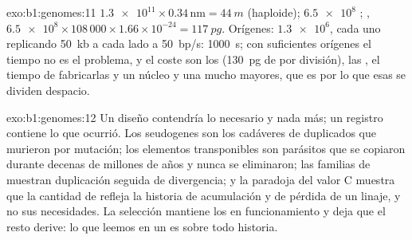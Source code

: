 \begin{solution}{exo:b1:genomes:11}
$\num{1.3e11}\times 0.34\,\mathrm{nm} = \qty{44}{m}$ (haploide);
$\num{6.5e8}$ ; , $\num{6.5e8}\times 108\,000\times
1.66\times 10^{-24} = \qty{117}{pg}$. Orígenes: $\num{1.3e6}$, cada uno
replicando \qty{50}{kb} a cada lado a \qty{50}{bp/s}: \qty{1000}{s}; con
suficientes orígenes el tiempo no es el problema, y el coste son los
 (\qty{130}{pg} de  por división), las , el tiempo de
fabricarlas y un núcleo y una  mucho mayores, que es por lo que esas
 se dividen despacio.
\end{solution}

\begin{solution}{exo:b1:genomes:12}
Un diseño contendría lo necesario y nada más; un registro contiene lo que
ocurrió. Los seudogenes son los cadáveres de  duplicados que murieron
por mutación; los elementos transponibles son parásitos que se copiaron
durante decenas de millones de años y nunca se eliminaron; las familias de
 muestran duplicación seguida de divergencia; y la paradoja del valor C
muestra que la cantidad de  refleja la historia de acumulación y de
pérdida de un linaje, y no sus necesidades. La selección mantiene los 
en funcionamiento y deja que el resto derive: lo que leemos en un  es
sobre todo historia.
\end{solution}

